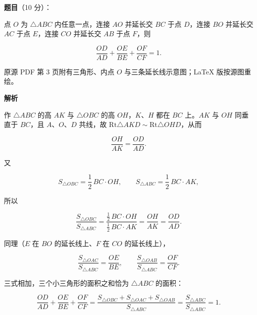 \begin{answer}

\textbf{题目}（10 分）：

点 $O$ 为 $\triangle ABC$ 内任意一点，连接 $AO$ 并延长交 $BC$ 于点 $D$，连接 $BO$ 并延长交 $AC$ 于点 $E$，连接 $CO$ 并延长交 $AB$ 于点 $F$，则

\nopagebreak[4]
\[
\frac{OD}{AD}+\frac{OE}{BE}+\frac{OF}{CF}=1.
\]

\begin{gktip}
原源 PDF 第 3 页附有三角形、内点 $O$ 与三条延长线示意图；LaTeX 版按源图重绘。
\end{gktip}
\nopagebreak[4]
\begin{center}\end{center}
\nopagebreak[4]
\textbf{解析}
\nopagebreak[4]
\begin{center}\end{center}
\nopagebreak[4]
作 $\triangle ABC$ 的高 $AK$ 与 $\triangle OBC$ 的高 $OH$，$K$、$H$ 都在 $BC$ 上。$AK$ 与 $OH$ 同垂直于 $BC$，且 $A$、$O$、$D$ 共线，故 $\mathrm{Rt}\triangle AKD\sim\mathrm{Rt}\triangle OHD$，从而

\nopagebreak[4]
\[
\frac{OH}{AK}=\frac{OD}{AD}.
\]

又

\nopagebreak[4]
\[
S_{\triangle OBC}=\frac12\,BC\cdot OH,
\qquad
S_{\triangle ABC}=\frac12\,BC\cdot AK,
\]

所以

\nopagebreak[4]
\[
\frac{S_{\triangle OBC}}{S_{\triangle ABC}}
=\frac{\frac12\,BC\cdot OH}{\frac12\,BC\cdot AK}
=\frac{OH}{AK}
=\frac{OD}{AD}.
\]

同理（$E$ 在 $BO$ 的延长线上、$F$ 在 $CO$ 的延长线上），

\nopagebreak[4]
\[
\frac{S_{\triangle OAC}}{S_{\triangle ABC}}=\frac{OE}{BE},
\qquad
\frac{S_{\triangle OAB}}{S_{\triangle ABC}}=\frac{OF}{CF}.
\]

三式相加，三个小三角形的面积之和恰为 $\triangle ABC$ 的面积：

\nopagebreak[4]
\[
\frac{OD}{AD}+\frac{OE}{BE}+\frac{OF}{CF}
=\frac{S_{\triangle OBC}+S_{\triangle OAC}+S_{\triangle OAB}}{S_{\triangle ABC}}
=\frac{S_{\triangle ABC}}{S_{\triangle ABC}}=1.
\]


\end{answer}
